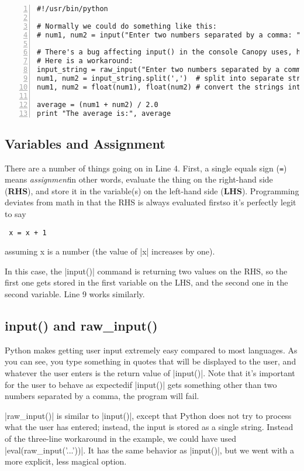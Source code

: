 \documentclass{article}
\begin{document}
\begin{Verbatim}[numbers=left]
#!/usr/bin/python

# Normally we could do something like this:
# num1, num2 = input("Enter two numbers separated by a comma: ")

# There's a bug affecting input() in the console Canopy uses, however.
# Here is a workaround:
input_string = raw_input("Enter two numbers separated by a comma: ")
num1, num2 = input_string.split(',')  # split into separate strings
num1, num2 = float(num1), float(num2) # convert the strings into numbers

average = (num1 + num2) / 2.0
print "The average is:", average
\end{Verbatim}

\subsection{Variables and Assignment}
There are a number of things going on in Line 4.  First, a single equals sign
(\texttt{=}) means \textit{assignment}\textemdash in other words, evaluate the
thing on the right-hand side (\textbf{RHS}), and store it in the variable(s) on
the left-hand side (\textbf{LHS}).  Programming deviates from math in that the
RHS is always evaluated first\textemdash so it's perfectly legit to say

\begin{Verbatim}
 x = x + 1
\end{Verbatim}

 assuming x is a number (the value of |x| increases by one).

In this case, the |input()| command is returning two values on the RHS, so the
first one gets stored in the first variable on the LHS, and the second one in
the second variable.  Line 9 works similarly.

\subsection{input() and raw_input()}
Python makes getting user input extremely easy compared to most languages.  As
you can see, you type something in quotes that will be displayed to the user,
and whatever the user enters is the return value of |input()|.  Note that it's
important for the user to behave as expected\textemdash if |input()| gets
something other than two numbers separated by a comma, the program will fail.

|raw_input()| is similar to |input()|, except that Python does not try to process what
the user has entered; instead, the input is stored as a single string.  Instead of the
three-line workaround in the example, we could have used |eval(raw_input('...'))|.  It
has the same behavior as |input()|, but we went with a more explicit, less magical option.
\end{document}
